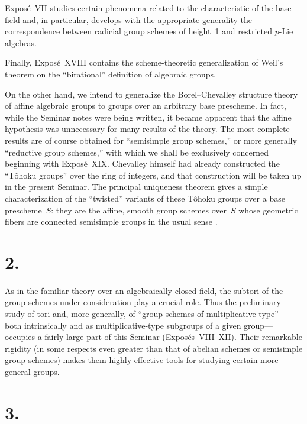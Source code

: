 Expos\'e~VII studies certain phenomena related to the characteristic of the base
field and, in particular, develops with the appropriate generality the
correspondence between radicial group schemes of height~1 and restricted
$p$-Lie algebras.

Finally, Expos\'e~XVIII contains the scheme-theoretic generalization of Weil's
theorem on the ``birational'' definition of algebraic groups.

On the other hand, we intend to generalize the Borel--Chevalley structure theory of
affine algebraic groups to groups over an arbitrary base prescheme.  In fact, while
the Seminar notes were being written, it became apparent that the affine hypothesis
was unnecessary for many results of the theory.  The most complete results are of
course obtained for ``semisimple group schemes,'' or more generally ``reductive
group schemes,'' with which we shall be exclusively concerned beginning with
Expos\'e~XIX.  Chevalley himself had already constructed the ``T\^ohoku groups''
over the ring of integers, and that construction will be taken up in the present
Seminar.  The principal uniqueness
theorem gives a simple characterization of the ``twisted''
variants of these T\^ohoku groups over a base prescheme~$S$: they are the affine,
smooth group schemes over~$S$ whose geometric fibers are connected semisimple
groups in the usual sense%
.

\section*{2.}

As in the familiar theory over an algebraically closed field, the subtori of the
group schemes under consideration play a crucial role.  Thus the preliminary study
of tori and, more generally, of ``group schemes of multiplicative type''---both
intrinsically and as multiplicative-type subgroups of a given group---occupies a
fairly large part of this Seminar (Expos\'es~VIII--XII).  Their remarkable rigidity
(in some respects even greater than that of abelian schemes or semisimple group
schemes) makes them highly effective tools for studying certain more general groups.

\section*{3.}

